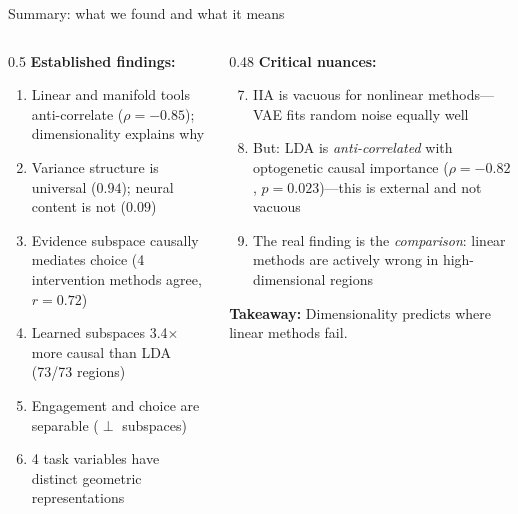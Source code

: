 \documentclass[aspectratio=169,11pt]{beamer}
\begin{document}
\begin{frame}{Summary: what we found and what it means}
\begin{columns}[T]
\begin{column}{0.5\textwidth}
\textbf{Established findings:}
\begin{enumerate}
  \item Linear and manifold tools anti-correlate ($\rho = -0.85$); dimensionality explains why
  \item Variance structure is universal ($0.94$); neural content is not ($0.09$)
  \item Evidence subspace causally mediates choice (4 intervention methods agree, $r = 0.72$)
  \item Learned subspaces 3.4$\times$ more causal than LDA (73/73 regions)
  \item Engagement and choice are separable ($\perp$ subspaces)
  \item 4 task variables have distinct geometric representations
\end{enumerate}
\end{column}
\begin{column}{0.48\textwidth}
\textbf{Critical nuances:}
\begin{enumerate}
  \setcounter{enumi}{6}
  \item \textcolor{fail}{IIA is vacuous for nonlinear methods}---VAE fits random noise equally well
  \item \textcolor{pass}{But:} LDA is \emph{anti-correlated} with optogenetic causal importance ($\rho = -0.82$, $p = 0.023$)---this is external and not vacuous
  \item The real finding is the \emph{comparison}: linear methods are actively wrong in high-dimensional regions
\end{enumerate}

\vspace{0.3em}
{\small \textbf{Takeaway:} Dimensionality predicts where linear methods fail.}
\end{column}
\end{columns}
\end{frame}
\end{document}
